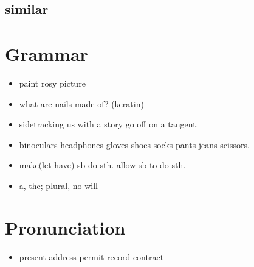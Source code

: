 \documentclass[a4paper,11pt,twoside]{book}
\begin{document}
\section{similar}


\chapter{Grammar}
\begin{itemize}
	\item paint rosy picture
	
	\item what are nails made of? (keratin)
	
	\item sidetracking us with a story
	go off on a tangent. 
	
	\item binoculars headphones gloves shoes socks pants jeans scissors.
	
	\item make(let have) sb do sth. allow sb to do sth. 
	
	\item a, the;   plural,  no will
	
		
\end{itemize}


\chapter{Pronunciation}
\begin{itemize}
	\item present address permit record contract 
\end{itemize}
	


\end{document}

